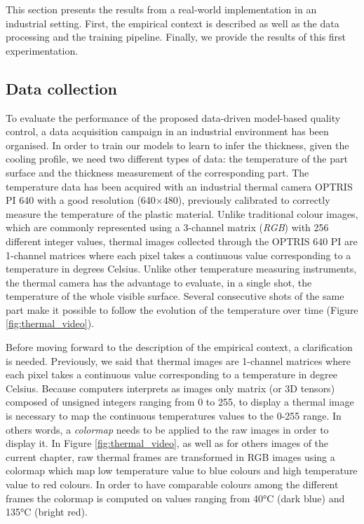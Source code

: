 This section presents the results from a real-world implementation in an industrial setting. First, the empirical context is described as well as the data processing and the training pipeline. Finally, we provide the results of this first experimentation.

\subsection{Data collection}

To evaluate the performance of the proposed data-driven model-based quality control, a data acquisition campaign in an industrial environment has been organised. In order to train our models to learn to infer the thickness, given the cooling profile, we need two different types of data: the temperature of the part surface and the thickness measurement of the corresponding part. The temperature data  has been acquired with an industrial thermal camera OPTRIS PI 640 with a good resolution (640$\times$480), previously calibrated to correctly measure the temperature of the plastic material. Unlike traditional colour images, which are commonly represented using a 3-channel matrix (\textit{RGB}) with 256 different integer values, thermal images collected through the OPTRIS 640 PI are 1-channel matrices where each pixel takes a continuous value corresponding to a temperature in degrees Celsius. Unlike other temperature measuring instruments, the thermal camera has the advantage to evaluate, in a single shot, the temperature of the whole visible surface. Several consecutive shots of the same part make it possible to follow the evolution of the temperature over time (Figure \ref{fig:thermal_video}). 

Before moving forward to the description of the empirical context, a clarification is needed. Previously, we said that thermal images are 1-channel matrices where each pixel takes a continuous value corresponding to a temperature in degree Celsius. Because computers interprets as images only matrix (or 3D tensors) composed of unsigned integers ranging from 0 to 255, to display a thermal image is necessary to map the continuous temperatures values to the 0-255 range. In others words, a \textit{colormap} needs to be applied to the raw images in order to display it. In Figure \ref{fig:thermal_video}, as well as for others images of the current chapter, raw thermal frames are transformed in RGB images using a colormap which map low temperature value to blue colours and high temperature value to red colours. In order to have comparable colours among the different frames the colormap is computed on values ranging from 40°C (dark blue) and 135°C (bright red).  


